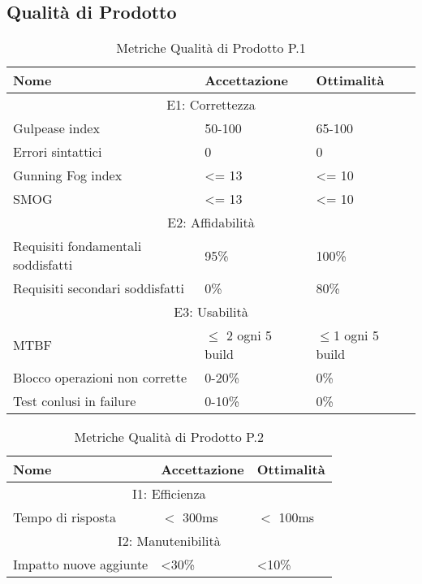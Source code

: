\subsection{Qualità di Prodotto}
\begin{table}[!htpb]
	\centering
	\renewcommand{\arraystretch}{2} 
	\begin{tabular}{|p{8cm}|p{3.5cm}|p{3.5cm}|}
		\rowcolor{orange!50}
		\hline
		\textbf{Nome} & \textbf{Accettazione} & \textbf{Ottimalità} \\ 
		\hline
		\multicolumn{3}{|c|}{E1: Correttezza}\\
		\hline
		Gulpease index & 50-100 & 65-100 \\ \hline
		Errori sintattici & 0 & 0 \\ \hline
		Gunning Fog index & \textless= 13 & \textless= 10 \\ \hline
		SMOG & \textless= 13 & \textless= 10 \\ \hline
	    \multicolumn{3}{|c|}{E2: Affidabilità} \\
		\hline
		Requisiti fondamentali soddisfatti & 95\% & 100\% \\ \hline
		Requisiti secondari soddisfatti & 0\% & 80\% \\ \hline
	    \multicolumn{3}{|c|}{E3: Usabilità} \\
		\hline
		MTBF & $\leq$ 2 ogni 5 build & $\leq$1 ogni 5 build \\ \hline
		Blocco operazioni non corrette & 0-20\% & 0\% \\ \hline
		Test conlusi in failure & 0-10\% & 0\% \\ \hline
	\end{tabular}
	\caption{Metriche Qualità di Prodotto P.1}
\end{table}	        
\begin{table}[!htpb]
	\centering
	\renewcommand{\arraystretch}{2} 
	\begin{tabular}{|p{8cm}|p{3.5cm}|p{3.5cm}|}
		\rowcolor{orange!50}
		\hline
		\textbf{Nome} & \textbf{Accettazione} & \textbf{Ottimalità} \\ 
		\hline
        \multicolumn{3}{|c|}{I1: Efficienza} \\
		\hline
		Tempo di risposta & $<$ 300ms & $<$ 100ms \\ \hline 
	    \multicolumn{3}{|c|}{I2: Manutenibilità} \\
		\hline
		Impatto nuove aggiunte & <30\% & <10\% \\ \hline 
	\end{tabular}
	\caption{Metriche Qualità di Prodotto P.2}
\end{table}